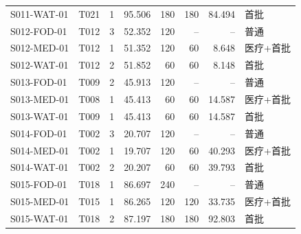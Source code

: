 \begin{longtable}{@{}llrrrrrl@{}}
S011-WAT-01 & T021 & 1 & 95.506 & 180 & 180 & 84.494 & 首批 \\
S012-FOD-01 & T012 & 3 & 52.352 & 120 & -- & -- & 普通 \\
S012-MED-01 & T012 & 1 & 51.352 & 120 & 60 & 8.648 & 医疗+首批 \\
S012-WAT-01 & T012 & 2 & 51.852 & 60 & 60 & 8.148 & 首批 \\
S013-FOD-01 & T009 & 2 & 45.913 & 120 & -- & -- & 普通 \\
S013-MED-01 & T008 & 1 & 45.413 & 60 & 60 & 14.587 & 医疗+首批 \\
S013-WAT-01 & T009 & 1 & 45.413 & 60 & 60 & 14.587 & 首批 \\
S014-FOD-01 & T002 & 3 & 20.707 & 120 & -- & -- & 普通 \\
S014-MED-01 & T002 & 1 & 19.707 & 120 & 60 & 40.293 & 医疗+首批 \\
S014-WAT-01 & T002 & 2 & 20.207 & 60 & 60 & 39.793 & 首批 \\
S015-FOD-01 & T018 & 1 & 86.697 & 240 & -- & -- & 普通 \\
S015-MED-01 & T015 & 1 & 86.265 & 120 & 120 & 33.735 & 医疗+首批 \\
S015-WAT-01 & T018 & 2 & 87.197 & 180 & 180 & 92.803 & 首批 \\
\end{longtable}
\endgroup


